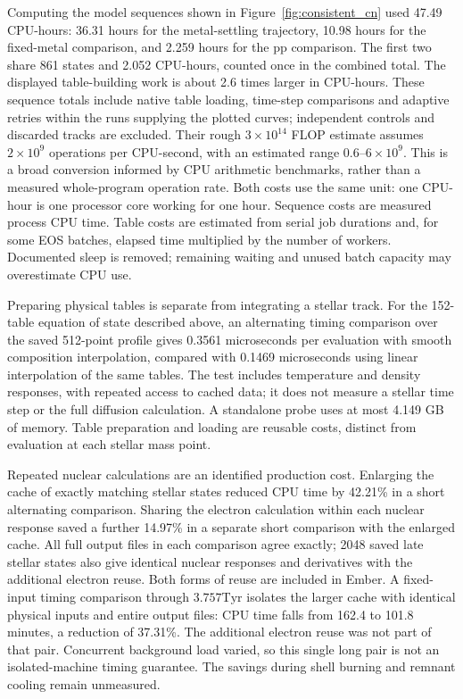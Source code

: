 \documentclass[11pt,letterpaper]{article}
\newcommand{\Tyr}{\mathrm{Tyr}}
\begin{document}
Computing the model sequences shown in Figure~\ref{fig:consistent_cn}
used 47.49 CPU-hours: 36.31 hours for the metal-settling trajectory,
10.98 hours for the fixed-metal comparison, and 2.259 hours for the pp
comparison. The first two share 861 states and 2.052 CPU-hours, counted
once in the combined total. The displayed table-building work is about
2.6 times larger in CPU-hours. These sequence totals include native
table loading, time-step comparisons and adaptive retries within the runs
supplying the plotted curves; independent controls and discarded tracks are
excluded. Their rough $3\times10^{14}$ FLOP estimate assumes
$2\times10^9$ operations per CPU-second, with an estimated range
$0.6$--$6\times10^9$. This is a broad conversion informed by CPU arithmetic
benchmarks, rather than a measured whole-program operation rate.
Both costs use the same unit: one CPU-hour is one processor core working
for one hour. Sequence costs are measured process CPU time. Table costs
are estimated from serial job durations and, for some EOS batches, elapsed
time multiplied by the number of workers. Documented sleep is removed;
remaining waiting and unused batch capacity may overestimate CPU use.

Preparing physical tables is separate from integrating a stellar track.
For the 152-table equation of state described above, an alternating timing
comparison over the saved 512-point profile gives 0.3561 microseconds per
evaluation with smooth composition interpolation, compared with 0.1469
microseconds using linear interpolation of the same tables. The test includes
temperature and density responses, with repeated access to cached data;
it does not measure a stellar time step or the full diffusion calculation.
A standalone probe uses at most 4.149 GB of memory.
Table preparation and loading are reusable costs, distinct from evaluation
at each stellar mass point.

Repeated nuclear calculations are an identified production cost. Enlarging the
cache of exactly matching stellar states reduced CPU time by 42.21\% in a
short alternating comparison. Sharing the electron calculation within each
nuclear response saved a further 14.97\% in a separate short comparison with
the enlarged cache. All full output files in each comparison agree exactly;
2048 saved late stellar states also give identical nuclear responses and
derivatives with the additional electron reuse. Both forms of reuse are included in Ember.
A fixed-input timing comparison through $3.757\Tyr$ isolates the larger cache with identical
physical inputs and entire output files: CPU time falls from 162.4 to 101.8
minutes, a reduction of 37.31\%. The additional electron reuse was not part
of that pair. Concurrent background load varied, so this single long pair is not
an isolated-machine timing guarantee. The savings during shell burning and
remnant cooling remain unmeasured.
\end{document}
